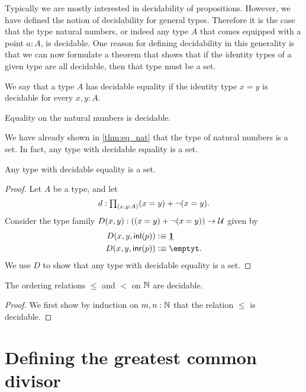 Typically we are mostly interested in decidability of propositions. However, we have defined the notion of decidability for general types. Therefore it is the case that the type natural numbers, or indeed any type $A$ that comes equipped with a point $a:A$, is decidable. One reason for defining decidability in this generality is that we can now formulate a theorem that shows that if the identity types of a given type are all decidable, then that type must be a set.

\begin{defn}
  We say that a type $A$ has decidable equality if the identity type $x=y$ is decidable for every $x,y:A$. 
\end{defn}

\begin{lem}
  Equality on the natural numbers is decidable.
\end{lem}

We have already shown in \cref{thm:eq_nat} that the type of natural numbers is a set. In fact, any type with decidable equality is a set.

\begin{thm}[Hedberg]
  Any type with decidable equality is a set.
\end{thm}

\begin{proof}
  Let $A$ be a type, and let
  \begin{equation*}
    d:\prd{x,y:A}(x=y)+\neg(x=y).
  \end{equation*}
  Consider the type family $D(x,y):((\id{x}{y})+\neg(\id{x}{y}))\to\UU$ given by
  \begin{align*}
    D(x,y,\inl(p)) & \defeq \unit \\
    D(x,y,\inr(p)) & \defeq \emptyt.
  \end{align*}
  We use $D$ to show that any type with decidable equality is a set.
\end{proof}

\begin{lem}
  The ordering relations $\leq$ and $<$ on $\mathbb{N}$ are decidable.
\end{lem}

\begin{proof}
  We first show by induction on $m,n:\mathbb{N}$ that the relation $\leq$ is decidable.
\end{proof}

\section{Defining the greatest common divisor}


